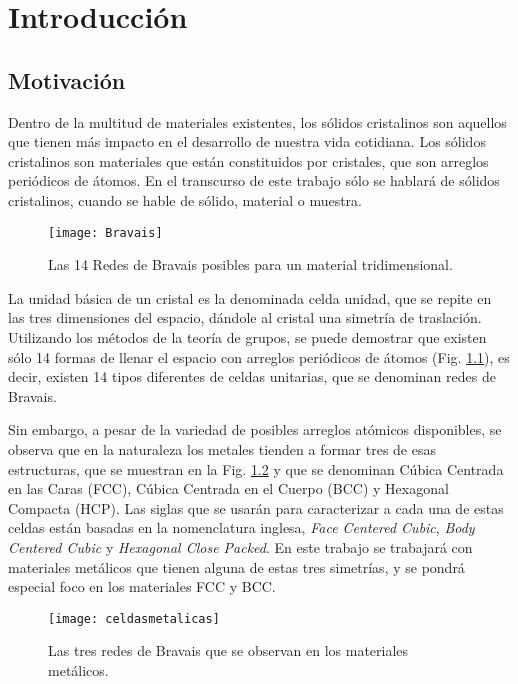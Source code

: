 \chapter{Introducción}
\graphicspath{{./figs/01_intro/}}
\section{Motivación}\label{S:motivacion}
Dentro de la multitud de materiales existentes, los sólidos cristalinos son aquellos que tienen más impacto en el desarrollo de nuestra vida cotidiana. 
Los sólidos cristalinos son materiales que están constituidos por cristales, que son arreglos periódicos de átomos. 
En el transcurso de este trabajo sólo se hablará de sólidos cristalinos, cuando se hable de sólido, material o muestra.

\begin{figure}[h!]
  \centering
  \texttt{[image: Bravais]}
  \caption{Las 14 Redes de Bravais posibles para un material tridimensional.}
  \label{fig:Bravais}
\end{figure}

La unidad básica de un cristal es la denominada celda unidad, que se repite en las tres dimensiones del espacio, dándole al cristal una simetría de traslación. Utilizando los métodos de la teoría de grupos, se puede demostrar que existen sólo 14 formas de llenar el espacio con arreglos periódicos de átomos (Fig. \ref{fig:Bravais}), es decir, existen 14 tipos diferentes de celdas unitarias, que se denominan redes de Bravais\cite{hahn2005international}.

Sin embargo, a pesar de la variedad de posibles arreglos atómicos disponibles, se observa que en la naturaleza los metales tienden a formar tres de esas estructuras, que se muestran en la Fig. \ref{fig:celdasmetalicas} y que se denominan Cúbica Centrada en las Caras (FCC), Cúbica Centrada en el Cuerpo (BCC) y Hexagonal Compacta (HCP). 
Las siglas que se usarán para caracterizar a cada una de estas celdas están basadas en la nomenclatura inglesa, \textit{Face Centered Cubic}, \textit{Body Centered Cubic} y \textit{Hexagonal Close Packed}. En este trabajo se trabajará con materiales metálicos que tienen alguna de estas tres simetrías, y se pondrá especial foco en los materiales FCC y BCC.

\begin{figure}[h!]
  \centering
  \texttt{[image: celdasmetalicas]}
  \caption{Las tres redes de Bravais que se observan en los materiales metálicos.}
  \label{fig:celdasmetalicas}
\end{figure} 

